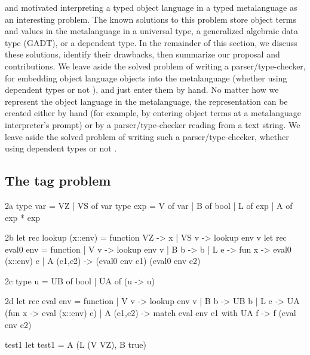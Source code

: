  and \citet{xi-guarded} motivated interpreting
a typed object language in a typed metalanguage as an interesting
problem.  The known solutions to this problem store object terms and
values in the metalanguage in a universal type, a generalized algebraic
data type (GADT), or a dependent type.  In the remainder of this section,
we discuss these solutions, identify their drawbacks, then summarize our
proposal and contributions.  
\ifshort
We leave aside the solved problem of writing a parser\slash type\hyp checker,
for embedding object language objects into the metalanguage
(whether using dependent types \cite{WalidICFP02} or not \cite{baars-typing}),
and just enter them by hand.
\else
No matter how we represent the object language in the
metalanguage, the representation can be created either by hand (for example, by
entering object terms at a metalanguage interpreter's prompt) or
by a parser\slash type\hyp checker reading from a text string.
We leave aside the solved problem of writing such a parser\slash type\hyp checker,
whether using dependent types \cite{WalidICFP02} or not \cite{baars-typing}.
\fi

\subsection{The tag problem}\label{tagproblem}

\begin{SaveVerbatim}{2a}
type var = VZ | VS of var
type exp = V of var | B of bool | L of exp | A of exp * exp
\end{SaveVerbatim}
\begin{SaveVerbatim}[commandchars=\@\{\}]{2b}
let rec lookup (x::env) = function VZ -> x | VS v -> lookup env v
let rec eval0 env = function
| V v       -> lookup env v
| B b       -> b 
| L e       -> fun x -> eval0 (x::env) e
| A (e1,e2) -> (eval0 env e1) (eval0 env e2) 
\end{SaveVerbatim}
\begin{SaveVerbatim}{2c}
type u = UB of bool | UA of (u -> u)
\end{SaveVerbatim}
\begin{SaveVerbatim}{2d}
let rec eval env = function
| V v       -> lookup env v
| B b       -> UB b
| L e       -> UA (fun x -> eval (x::env) e)
| A (e1,e2) -> match eval env e1 with UA f -> f (eval env e2)
\end{SaveVerbatim}
\begin{SaveVerbatim}{test1}
let test1 = A (L (V VZ), B true)
\end{SaveVerbatim}

